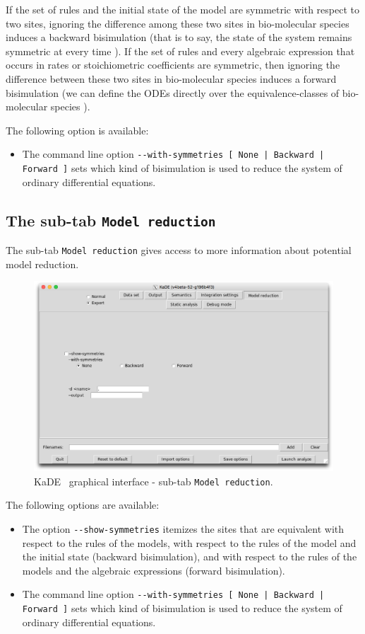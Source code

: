 \documentclass[11pt]{book}
\def\KaDE{\textsf{KaDE}}
\begin{document}
If the set of rules and the initial state of the model are symmetric with respect to two sites, ignoring the difference among these two sites in bio-molecular species induces a backward bisimulation (that is to say, the state of the system remains symmetric at every time \cite{buchholz_lump}). If the set of rules and every algebraic expression that occurs in rates or stoichiometric coefficients are symmetric, then ignoring the difference between these two sites in bio-molecular species induces a forward bisimulation (we can define the ODEs directly over the equivalence-classes of bio-molecular species \cite{buchholz_lump}).

The following option is available:
\begin{itemize}
  \item
The command line option \texttt{-{}-with-symmetries [ None | Backward | Forward ]} sets which kind of bisimulation is used to reduce the system of ordinary differential equations.
\end{itemize}

\subsection{The sub-tab \texttt{Model reduction}}

The sub-tab \texttt{Model reduction} gives access to more information about
potential model reduction.
\begin{figure}[htbp]
\centering
\includegraphics[width=12cm,bb=0 0 1904 1208]{img/kade_4.png}
\caption{\KaDE~ graphical interface - sub-tab \texttt{Model reduction}.}
\label{fig:kade:4}
\end{figure}

The following options are available:
\begin{itemize}
  \item The option \texttt{-{}-show-symmetries} itemizes the sites that are equivalent with respect to the rules of the models, with respect to the rules of the model and the initial state (backward bisimulation), and with respect to the rules of the models and the algebraic expressions (forward bisimulation).
  \item The command line option \texttt{-{}-with-symmetries [ None | Backward | Forward ]} sets which kind of bisimulation is used to reduce the system of ordinary differential equations.
\end{itemize}
\end{document}
